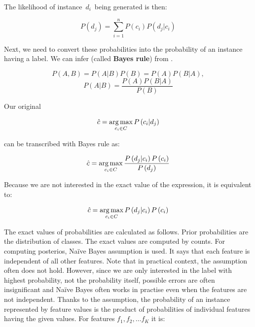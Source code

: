 The likelihood of instance~$d_i$~being generated is then:

\begin{equation}
	P\left(d_j\right) = \sum_{i=1}^{n}{
	P\left(c_i\right)
	P\left(d_j|c_i\right)
}
\end{equation}

Next, we need to convert these probabilities into the probability of an instance having a label.
We can infer  (called \textbf{Bayes rule}) from .

\begin{equation}
	\label{eq:bayesinfer}
	P\left(A,B\right) = 
	P\left(A|B\right)
	P\left(B\right) = 
	P\left(A\right)
	P\left(B|A\right),
\end{equation}
\begin{equation}
	\label{eq:bayesrule}
	P\left(A|B\right) =
	\frac{
	P\left(A\right)
P\left(B|A\right)}
{P\left(B\right)}
\end{equation}

Our original 

\begin{equation}
	\hat{c} = \operatorname*{arg\,max}_{c_i \in C} P\left(c_i  | d_j \right)
\end{equation}

can be transcribed with Bayes rule as:

\begin{equation}
	\hat{c} = \operatorname*{arg\,max}_{c_i \in C}
	\frac{
	P\left(d_j  | c_i \right)
	P\left( c_i \right)
}{
	P\left( d_j \right)
}
\end{equation}

Because we are not interested in the exact value of the expression, it is equivalent to:

\begin{equation}
	\label{eq:classprb}
	\hat{c} = \operatorname*{arg\,max}_{c_i \in C}
	P\left(d_j  | c_i \right)
	P\left( c_i \right)
\end{equation}

The exact values of probabilities are calculated as follows.
Prior probabilities are the distribution of classes.
The exact values are computed by counts.
For computing posterios, Na\"{i}ve Bayes assumption is used.
It says that each feature is independent of all other features.
Note that in practical context, the assumption often does not hold.
However, since we are only interested in the label with highest probability,
not the probability itself, possible errors are often insignificant and Na\"{i}ve Bayes often works in practise even when the features are not independent.
Thanks to the assumption, the probability of an instance represented by feature values is the product
of probabilities of individual features having the given values.
For features $f_1, f_2, \dots f_K$ it is:

